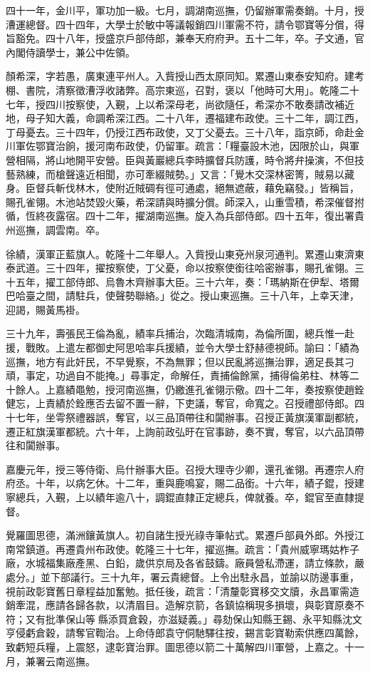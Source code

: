 \begin{pinyinscope}
四十一年，金川平，軍功加一級。七月，調湖南巡撫，仍留辦軍需奏銷。十月，授漕運總督。四十四年，大學士於敏中等議報銷四川軍需不符，請令鄂寶等分償，得旨豁免。四十八年，授盛京戶部侍郎，兼奉天府府尹。五十二年，卒。子文通，官內閣侍讀學士，兼公中佐領。

顏希深，字若愚，廣東連平州人。入貲授山西太原同知。累遷山東泰安知府。建考棚、書院，清察徵漕浮收諸弊。高宗東巡，召對，褒以「他時可大用」。乾隆二十七年，授四川按察使，入覲，上以希深母老，尚欲隨任，希深亦不敢奏請改補近地，母子知大義，命調希深江西。二十八年，遷福建布政使。三十二年，調江西，丁母憂去。三十四年，仍授江西布政使，又丁父憂去。三十八年，詣京師，命赴金川軍佐鄂寶治餉，援河南布政使，仍留軍。疏言：「糧臺設木池，因限於山，與軍營相隔，將山地開平安營。臣與黃巖總兵李時擴督兵防護，時令將弁操演，不但技藝熟練，而槍聲遠近相聞，亦可牽綴賊勢。」又言：「覺木交深林密箐，賊易以藏身。臣督兵斬伐林木，使附近賊碉有徑可通處，絕無遮蔽，藉免竊發。」皆稱旨，賜孔雀翎。木池站焚毀火藥，希深請與時擴分償。師深入，山重雪積，希深催督拊循，恆終夜露宿。四十二年，擢湖南巡撫。旋入為兵部侍郎。四十五年，復出署貴州巡撫，調雲南。卒。

徐績，漢軍正藍旗人。乾隆十二年舉人。入貲授山東兗州泉河通判。累遷山東濟東泰武道。三十四年，擢按察使，丁父憂，命以按察使銜往哈密辦事，賜孔雀翎。三十五年，擢工部侍郎、烏魯木齊辦事大臣。三十六年，奏：「瑪納斯在伊犁、塔爾巴哈臺之間，請駐兵，使聲勢聯絡。」從之。授山東巡撫。三十八年，上幸天津，迎謁，賜黃馬褂。

三十九年，壽張民王倫為亂，績率兵捕治，次臨清城南，為倫所圍，總兵惟一赴援，戰敗。上遣左都御史阿思哈率兵援績，並令大學士舒赫德視師。諭曰：「績為巡撫，地方有此奸民，不早覺察，不為無罪；但以民亂將巡撫治罪，適足長其刁頑，事定，功過自不能掩。」尋事定，命解任，責捕倫餘黨，捕得倫弟柱、林等二十餘人。上嘉績黽勉，授河南巡撫，仍繳進孔雀翎示儆。四十二年，奏按察使趙銓健忘，上責績於銓應否去留不置一辭，下吏議，奪官，命寬之。召授禮部侍郎。四十七年，坐雩祭禮器誤，奪官，以三品頂帶往和闐辦事。召授正黃旗漢軍副都統，遷正紅旗漢軍都統。六十年，上詢前政弘旴在官事跡，奏不實，奪官，以六品頂帶往和闐辦事。

嘉慶元年，授三等侍衛、烏什辦事大臣。召授大理寺少卿，還孔雀翎。再遷宗人府府丞。十年，以病乞休。十二年，重與鹿鳴宴，賜二品銜。十六年，績子錕，授建寧總兵，入覲，上以績年逾八十，調錕直隸正定總兵，俾就養。卒，錕官至直隸提督。

覺羅圖思德，滿洲鑲黃旗人。初自諸生授光祿寺筆帖式。累遷戶部員外郎。外授江南常鎮道。再遷貴州布政使。乾隆三十七年，擢巡撫。疏言：「貴州威寧瑪姑柞子廠，水城福集廠產黑、白鉛，歲供京局及各省鼓鑄。廠員營私滯運，請立條款，嚴處分。」並下部議行。三十九年，署云貴總督。上令出駐永昌，並諭以防邊事重，視前政彰寶舊日章程益加奮勉。抵任後，疏言：「清釐彰寶移交文牘，永昌軍需造銷牽混，應請各歸各款，以清眉目。造解京箭，各鎮協稱現多損壞，與彰寶原奏不符；又有批準保山等縣添買倉穀，亦滋疑義。」尋劾保山知縣王錫、永平知縣沈文亨侵虧倉穀，請奪官鞫治。上命侍郎袁守侗馳驛往按，錫言彰寶勒索供應四萬餘，致虧短兵糧，上震怒，逮彰寶治罪。圖思德以箭二十萬解四川軍營，上嘉之。十一月，兼署云南巡撫。


\end{pinyinscope}
